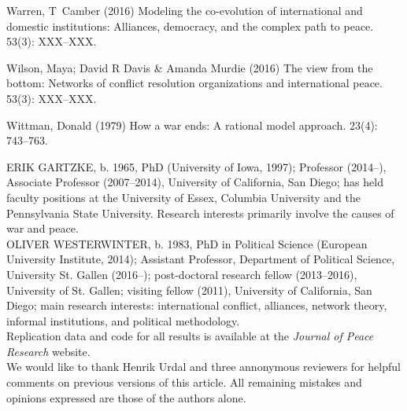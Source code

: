 \documentclass[12pt]{article}
\theoremstyle{hypothesis}
\begin{document}
\begin{thebibliography}{}
Warren, T~Camber (2016) Modeling the co-evolution of international and domestic institutions: Alliances, democracy, and the complex path to peace.
 { 53\/}(3): XXX--XXX.

Wilson, Maya; David R Davis  \& Amanda Murdie (2016) The view from the bottom: Networks of conflict resolution organizations and international peace.
 { 53\/}(3): XXX--XXX.

Wittman, Donald (1979) How a war ends: A rational model approach.
 { 23\/}(4): 743--763.

\end{thebibliography}

\newpage

\noindent ERIK GARTZKE, b. 1965, PhD (University of Iowa, 1997); Professor (2014--), Associate Professor (2007--2014), University of California, San Diego; has held faculty positions at the University of Essex, Columbia University and the Pennsylvania State University. Research interests primarily involve the causes of war and peace.\\

\noindent OLIVER WESTERWINTER, b. 1983, PhD in Political Science (European University Institute, 2014); Assistant Professor, Department of Political Science, University St. Gallen (2016--); post-doctoral research fellow (2013--2016), University of St. Gallen; visiting fellow (2011), University of California, San Diego; main research interests: international conflict, alliances, network theory, informal institutions, and political methodology.\\

\noindent Replication data and code for all results is available at the \emph{Journal of Peace Research} website.\\

\noindent We would like to thank Henrik Urdal and three annonymous reviewers for helpful comments on previous versions of this article. All remaining mistakes and opinions expressed are those of the authors alone.
\end{document}
